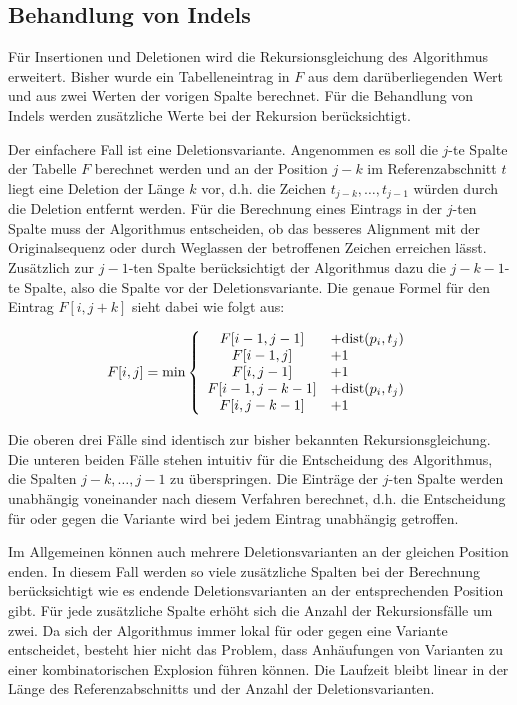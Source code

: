 \subsection{Behandlung von Indels}
\label{sec:align:variants:indel}

Für Insertionen und Deletionen wird die Rekursionsgleichung des Algorithmus erweitert. Bisher wurde ein Tabelleneintrag in $F$ aus dem darüberliegenden Wert und aus zwei Werten der vorigen Spalte berechnet. Für die Behandlung von Indels werden zusätzliche Werte bei der Rekursion berücksichtigt.

Der einfachere Fall ist eine Deletionsvariante. Angenommen es soll die $j$-te Spalte der Tabelle $F$ berechnet werden und an der Position $j-k$ im Referenzabschnitt $t$ liegt eine Deletion der Länge $k$ vor, d.h. die Zeichen $t_{j-k}, \ldots , t_{j-1}$ würden durch die Deletion entfernt werden. Für die Berechnung eines Eintrags in der $j$-ten Spalte muss der Algorithmus entscheiden, ob das besseres Alignment mit der Originalsequenz oder durch Weglassen der betroffenen Zeichen erreichen lässt. Zusätzlich zur $j-1$-ten Spalte berücksichtigt der Algorithmus dazu die $j-k-1$-te Spalte, also die Spalte vor der Deletionsvariante. Die genaue Formel für den Eintrag $F[i,j+k]$ sieht dabei wie folgt aus:

\[
F[i,j] = \min \left\{\begin{array}{cl} F[i-1,j-1] &+ \text{dist}(p_i,t_j)\\ F[i-1,j] &+ 1 \\ F[i,j-1] &+ 1 \\ F[i-1,j-k-1] &+ \text{dist}(p_i,t_j) \\ F[i,j-k-1] &+ 1 \end{array}\right. 
\]

Die oberen drei Fälle sind identisch zur bisher bekannten Rekursionsgleichung. Die unteren beiden Fälle stehen intuitiv für die Entscheidung des Algorithmus, die Spalten $j-k, \ldots, j-1$ zu \glqq überspringen\grqq. Die Einträge der $j$-ten Spalte werden unabhängig voneinander nach diesem Verfahren berechnet, d.h. die Entscheidung für oder gegen die Variante wird bei jedem Eintrag unabhängig getroffen.

Im Allgemeinen können auch mehrere Deletionsvarianten an der gleichen Position enden. In diesem Fall werden so viele zusätzliche Spalten bei der Berechnung berücksichtigt wie es endende Deletionsvarianten an der entsprechenden Position gibt. Für jede zusätzliche Spalte erhöht sich die Anzahl der Rekursionsfälle um zwei. Da sich der Algorithmus immer lokal für oder gegen eine Variante entscheidet, besteht hier nicht das Problem, dass Anhäufungen von Varianten zu einer kombinatorischen Explosion führen können. Die Laufzeit bleibt linear in der Länge des Referenzabschnitts und der Anzahl der Deletionsvarianten.

